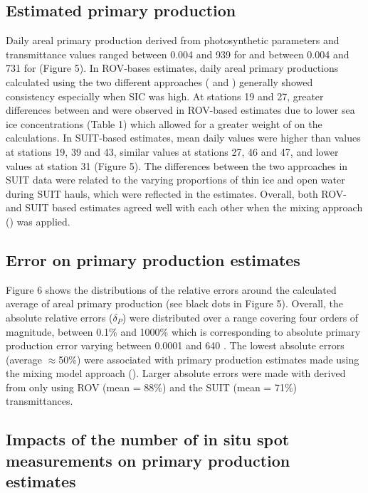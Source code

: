 \subsection{Estimated primary production}

Daily areal primary production derived from photosynthetic parameters and transmittance values ranged between 0.004 and 939 \dailypp{} for \ppunderice{} and between 0.004 and 731 \dailypp{} for \ppmixing{} (Figure 5). In ROV-bases estimates, daily areal primary productions calculated using the two different approaches (\ppunderice{} and \ppmixing{}) generally showed consistency especially when SIC was high. At stations 19 and 27, greater differences between \ppunderice{} and \ppmixing{} were observed in ROV-based estimates due to lower sea ice concentrations (Table 1) which allowed for a greater weight of \ppopenwater{} on the calculations. In SUIT-based estimates, mean daily \ppunderice{} values were higher than \ppmixing{} values at stations 19, 39 and 43, similar values at stations 27, 46 and 47, and lower values at station 31 (Figure 5). The differences between the two approaches in SUIT data were related to the varying proportions of thin ice and open water during SUIT hauls, which were reflected in the \ppunderice{} estimates. Overall, both ROV- and SUIT based estimates agreed well with each other when the mixing approach (\ppmixing{}) was applied.

\subsection{Error on primary production estimates}

Figure 6 shows the distributions of the relative errors around the calculated average of areal primary production (see black dots in Figure 5). Overall, the absolute relative errors ($\delta_P$) were distributed over a range covering four orders of magnitude, between 0.1\% and 1000\% which is corresponding to absolute primary production error varying between 0.0001 and 640 \dailypp{}. The lowest absolute errors (average $\approx$50\%) were associated with primary production estimates made using the mixing model approach (\ppmixing{}). Larger absolute errors were made with \ppunderice{} derived from only using ROV (mean = 88\%) and the SUIT (mean = 71\%) transmittances.

\subsection{Impacts of the number of in situ spot measurements on primary production estimates}

